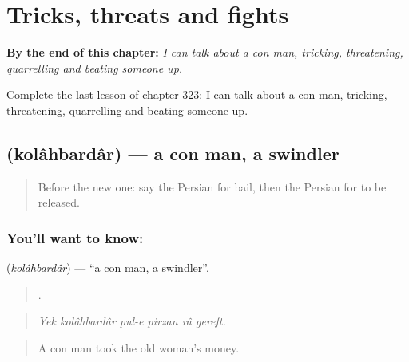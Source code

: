 
\chapter{Tricks, threats and fights}
\label{ch:fa-tricks-threats-and-fights}

\begin{chapteropening}
\textbf{By the end of this chapter:} \emph{I can talk about a con man, tricking, threatening, quarrelling and beating someone up.}

Complete the last lesson of chapter 323: I can talk about a con man, tricking, threatening, quarrelling and beating someone up.
\end{chapteropening}

\section[\texorpdfstring{\fa{کلاهبردار} (kolâhbardâr)}{کلاهبردار (kolâhbardâr)}]{ (kolâhbardâr) — a con man, a swindler}

\label{lesson:FA-C323-kolahbardar}



\begin{quote}
Before the new one: say the Persian for bail, then the Persian for to be released.
\end{quote}

\subsection*{You'll want to know: }
\textbf{} (\emph{kolâhbardâr}) — \textquotedblleft{}a con man, a swindler\textquotedblright{}.

\begin{quote}
     .
\end{quote}

\begin{quote}
\emph{Yek kolâhbardâr pul-e pirzan râ gereft.}
\end{quote}

\begin{quote}
A con man took the old woman's money.
\end{quote}

